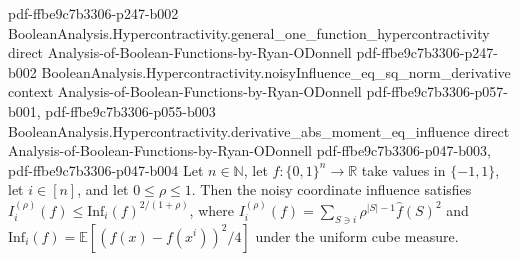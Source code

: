 \begin{theorem}
  {pdf-ffbe9c7b3306-p247-b002}
\proofstep
  {BooleanAnalysis.Hypercontractivity.general_one_function_hypercontractivity}
  {direct}
  {Analysis-of-Boolean-Functions-by-Ryan-ODonnell}
  {pdf-ffbe9c7b3306-p247-b002}
\proofstep
  {BooleanAnalysis.Hypercontractivity.noisyInfluence_eq_sq_norm_derivative}
  {context}
  {Analysis-of-Boolean-Functions-by-Ryan-ODonnell}
  {pdf-ffbe9c7b3306-p057-b001,
    pdf-ffbe9c7b3306-p055-b003}
\proofstep
  {BooleanAnalysis.Hypercontractivity.derivative_abs_moment_eq_influence}
  {direct}
  {Analysis-of-Boolean-Functions-by-Ryan-ODonnell}
  {pdf-ffbe9c7b3306-p047-b003,
    pdf-ffbe9c7b3306-p047-b004}
Let $n\in\mathbb N$, let $f:\{0,1\}^n\to\mathbb R$ take values in $\{-1,1\}$,
let $i\in[n]$, and let $0\le\rho\le1$. Then the noisy coordinate influence satisfies
$I_i^{(\rho)}(f)\le\mathrm{Inf}_i(f)^{2/(1+\rho)}$, where
$I_i^{(\rho)}(f)=\sum_{S\ni i}\rho^{|S|-1}\widehat f(S)^2$ and
$\mathrm{Inf}_i(f)=\mathbb E[(f(x)-f(x^i))^2/4]$ under the uniform cube measure.
\end{theorem}

